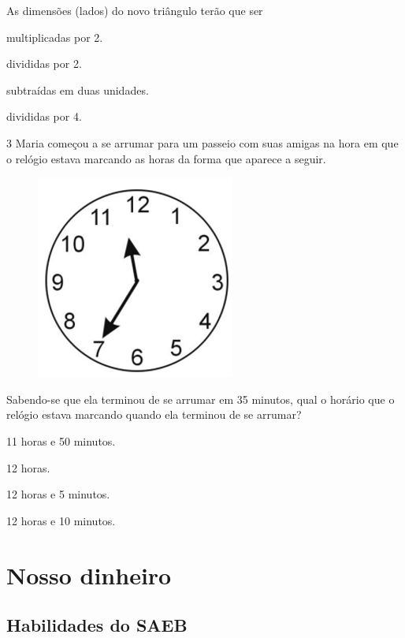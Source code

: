 As dimensões (lados) do novo triângulo terão que ser

\begin{escolha}
\item
  multiplicadas por 2.
\item
  divididas por 2.
\item
  subtraídas em duas unidades.
\item
  divididas por 4.
\end{escolha}


\pagebreak
\num{3} Maria começou a se arrumar para um passeio com suas amigas na hora
em que o relógio estava marcando as horas da forma que aparece a seguir.

\begin{figure}[htpb!]
\centering
\includegraphics[width=.5\textwidth]{./imgs/mat9.png}
\end{figure}

Sabendo-se que ela terminou de se arrumar em 35 minutos, qual o horário
que o relógio estava marcando quando ela terminou de se arrumar?

\begin{escolha}
\item
  11 horas e 50 minutos.
\item
  12 horas.
\item
  12 horas e 5 minutos.
\item
  12 horas e 10 minutos.
\end{escolha}


\chapter{Nosso dinheiro}

\section*{Habilidades do SAEB}

